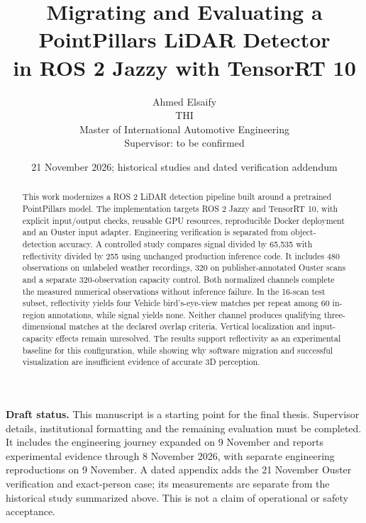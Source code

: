 \documentclass[11pt,a4paper]{article}
\title{Migrating and Evaluating a PointPillars LiDAR Detector\\in ROS 2 Jazzy with TensorRT 10}
\author{Ahmed Elsaify\\THI\\Master of International Automotive Engineering\\[1em]\small Supervisor: to be confirmed}
\date{21 November 2026; historical studies and dated verification addendum}
\begin{document}
\maketitle
\begin{abstract}
This work modernizes a ROS 2 LiDAR detection pipeline built around a pretrained
PointPillars model. The implementation targets ROS 2 Jazzy and TensorRT 10, with
explicit input/output checks, reusable GPU resources, reproducible Docker
deployment and an Ouster input adapter. Engineering verification is separated
from object-detection accuracy. A controlled study compares signal divided by
65,535 with reflectivity divided by 255 using unchanged production inference
code. It includes 480 observations on unlabeled weather recordings, 320 on
publisher-annotated Ouster scans and a separate 320-observation capacity control.
Both normalized channels complete the measured numerical observations without
inference failure. In the 16-scan test subset, reflectivity yields four Vehicle
bird's-eye-view matches per repeat among 60 in-region annotations, while signal
yields none. Neither channel produces qualifying three-dimensional matches at
the declared overlap criteria. Vertical localization and input-capacity effects
remain unresolved. The results support reflectivity as an experimental baseline
for this configuration, while showing why software migration and successful
visualization are insufficient evidence of accurate 3D perception.
\end{abstract}
\textbf{Draft status.} This manuscript is a starting point for the final thesis.
Supervisor details, institutional formatting and the
remaining evaluation must be completed. It includes the engineering journey expanded on 9 November and reports experimental evidence through
8 November 2026, with separate engineering reproductions on 9 November.
A dated appendix adds the 21 November Ouster verification and exact-person case;
its measurements are separate from the historical study summarized above.
This is not a claim of operational or safety acceptance.
\setcounter{tocdepth}{1}
\tableofcontents
\clearpage\listoffigures
\clearpage\listoftables
\clearpage
\end{document}
